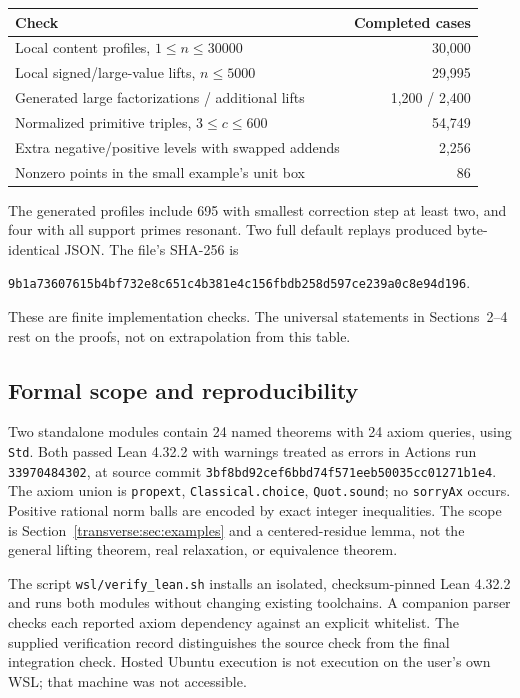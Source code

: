 \begin{center}
\begin{tabular}{lr}
\toprule
Check & Completed cases\\
\midrule
Local content profiles, $1\le n\le30000$ & 30,000\\
Local signed/large-value lifts, $n\le5000$ & 29,995\\
Generated large factorizations / additional lifts & 1,200 / 2,400\\
Normalized primitive triples, $3\le c\le600$ & 54,749\\
Extra negative/positive levels with swapped addends & 2,256\\
Nonzero points in the small example's unit box & 86\\
\bottomrule
\end{tabular}
\end{center}
The generated profiles include 695 with smallest correction step at least two, and four with all support primes resonant. Two full default replays produced byte-identical JSON. The file's SHA-256 is
\begin{center}\small\texttt{9b1a73607615b4bf732e8c651c4b381e4c156fbdb258d597ce239a0c8e94d196}.\end{center}
These are finite implementation checks. The universal statements in Sections~2--4 rest on the proofs, not on extrapolation from this table.

\subsection{Formal scope and reproducibility}
Two standalone modules contain 24 named theorems with 24 axiom queries, using \texttt{Std}. Both passed Lean 4.32.2 with warnings treated as errors in Actions run \texttt{33970484302}, at source commit \texttt{3bf8bd92cef6bbd74f571eeb50035cc01271b1e4}. The axiom union is \texttt{propext}, \texttt{Classical.choice}, \texttt{Quot.sound}; no \texttt{sorryAx} occurs. Positive rational norm balls are encoded by exact integer inequalities. The scope is Section~\ref{transverse:sec:examples} and a centered-residue lemma, not the general lifting theorem, real relaxation, or equivalence theorem.

The script \texttt{wsl/verify\_lean.sh} installs an isolated, checksum-pinned Lean 4.32.2 and runs both modules without changing existing toolchains. A companion parser checks each reported axiom dependency against an explicit whitelist. The supplied verification record distinguishes the source check from the final integration check. Hosted Ubuntu execution is not execution on the user's own WSL; that machine was not accessible.

